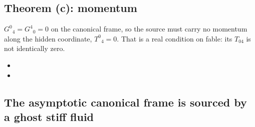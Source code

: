 \subsection{Theorem (c): momentum}
\label{sec:4.7}

$G^0{}_4=G^4{}_0=0$ on the canonical frame, so the source must carry no momentum along the hidden
coordinate, $T^0{}_4=0$. That is a real condition on fable: its $T_{04}$ is not identically zero.
\begin{itemize}
  \item {}
  \item {}
\end{itemize}

\subsection{The asymptotic canonical frame is sourced by a ghost stiff fluid}
\label{sec:4.8}

